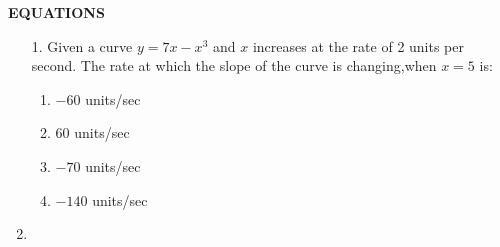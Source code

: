 \documentclass[12pt,-letter paper]{article}
\providecommand{\brak}[1]{\ensuremath{\left(#1\right)}}
\begin{document}
        \begin{center}                                                          \textbf{EQUATIONS}                                                      \end{center}                                                    \begin{enumerate}[label=\Alph*.]                                                \item                                                                           [1.]Given a curve $y=7x-x^3 $ and $x$ increases at the rate of 2 units per second.                                                              The rate  at which the slope of the curve  is changing,when $x=5$ is:                                                           
                \begin{enumerate}[label={$\brak{\Alph*}$}]                              \item$-60$ units/sec                                                            \item$60$ units/sec                                                     \item$-70$ units/sec                                                    \item$-140$ units/sec
                \end{enumerate}                                                 \item

\end{enumerate}
\end{document}
